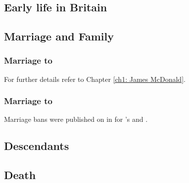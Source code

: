 \chapter[Mary Welch]{\welchMName{}}
\label{ch2: Mary Welch}

\section{Early life in Britain}

\section{Marriage and Family}

\subsection[Marriage to James McDonald]{Marriage to \mcdonaldJName}
For further details refer to Chapter \ref{ch1: James McDonald}.

\subsection[Marriage to Robert Henman]{Marriage to \henmanRName}
\label{ch2: Marriage to Robert Henman}

Marriage bans were published on  in \grahamstown{} for \welchMName{}'s and \henmanRName{} \autocite{settlers:JamesMcDonald} \autocite{settlers:MaryWelch}.

\section{Descendants}

\section{Death}